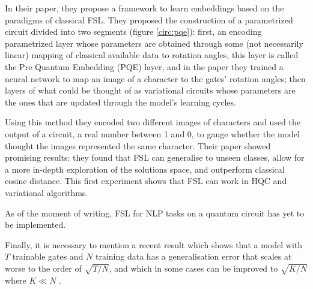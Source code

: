 In their paper, they propose a framework to learn embeddings based on the paradigms of classical FSL. They proposed the construction of a parametrized circuit divided into two segments (figure \ref{circ:pqe}): first, an encoding parametrized layer whose parameters are obtained through some (not necessarily linear) mapping of classical available data to rotation angles, this layer is called the Pre Quantum Embedding (PQE) layer, and in the paper they trained a neural network to map an image of a character to the gates' rotation angles; then layers of what could be thought of as variational circuits whose parameters are the ones that are updated through the model's learning cycles.



Using this method they encoded two different images of characters and used the output of a circuit, a real number between 1 and 0, to gauge whether the model thought the images represented the same character. Their paper showed promising results: they found that FSL can generalise to unseen classes, allow for a more in-depth exploration of the solutions space, and outperform classical cosine distance. This first experiment shows that FSL can work in HQC and variational algorithms.%

As of the moment of writing, FSL for NLP tasks on a quantum circuit has yet to be implemented.%

Finally, it is necessary to mention a recent result which shows that a model with $T$ trainable gates and $N$ training data has a generalisation error that scales at worse to the order of $\sqrt{T/N}$, and which in some cases can be improved to $\sqrt{K/N}$ where $K\ll N$ \cite{caro_generalization_2022}.




